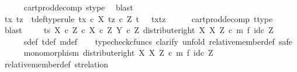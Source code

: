 \begin{isabellebody}
\ \ \ \ \isamarkupfalse%
\ cart{\isacharunderscore}{\kern0pt}prod{\isacharunderscore}{\kern0pt}decomp\ s{\isacharunderscore}{\kern0pt}type\ \isamarkupfalse%
\ blast\isanewline
\ \ \isamarkupfalse%
\ tx\ tz\ \ t{\isacharunderscore}{\kern0pt}def{\isacharbrackleft}{\kern0pt}type{\isacharunderscore}{\kern0pt}rule{\isacharbrackright}{\kern0pt}{\isacharcolon}{\kern0pt}\ {\isachardoublequoteopen}tx\ {\isasymin}\isactrlsub c\ X{\isachardoublequoteclose}\ {\isachardoublequoteopen}tz\ {\isasymin}\isactrlsub c\ Z{\isachardoublequoteclose}\ {\isachardoublequoteopen}t\ {\isacharequal}{\kern0pt}\ \ {\isasymlangle}tx{\isacharcomma}{\kern0pt}tz{\isasymrangle}{\isachardoublequoteclose}\isanewline
\ \ \ \ \isamarkupfalse%
\ cart{\isacharunderscore}{\kern0pt}prod{\isacharunderscore}{\kern0pt}decomp\ t{\isacharunderscore}{\kern0pt}type\ \isamarkupfalse%
\ blast\ \isanewline
\isanewline
\ \ \isamarkupfalse%
\ {\isachardoublequoteopen}{\isasymlangle}t{\isacharcomma}{\kern0pt}s{\isasymrangle}\ {\isasymin}\isactrlbsub {\isacharparenleft}{\kern0pt}X\ {\isasymtimes}\isactrlsub c\ Z{\isacharparenright}{\kern0pt}\ {\isasymtimes}\isactrlsub c\ {\isacharparenleft}{\kern0pt}X\ {\isasymtimes}\isactrlsub c\ Z{\isacharparenright}{\kern0pt}\isactrlesub \ {\isacharparenleft}{\kern0pt}Y\ {\isasymtimes}\isactrlsub c\ Z{\isacharcomma}{\kern0pt}\ distribute{\isacharunderscore}{\kern0pt}right\ X\ X\ Z\ {\isasymcirc}\isactrlsub c\ {\isacharparenleft}{\kern0pt}m\ {\isasymtimes}\isactrlsub f\ id\isactrlsub c\ Z{\isacharparenright}{\kern0pt}{\isacharparenright}{\kern0pt}{\isachardoublequoteclose}\ \isanewline
\ \ \ \ \isamarkupfalse%
\ s{\isacharunderscore}{\kern0pt}def\ t{\isacharunderscore}{\kern0pt}def\ m{\isacharunderscore}{\kern0pt}def\isanewline
\ \ \isamarkupfalse%
\ {\isacharparenleft}{\kern0pt}typecheck{\isacharunderscore}{\kern0pt}cfuncs{\isacharcomma}{\kern0pt}\ clarify{\isacharcomma}{\kern0pt}\ unfold\ relative{\isacharunderscore}{\kern0pt}member{\isacharunderscore}{\kern0pt}def{}{\isacharcomma}{\kern0pt}\ safe{\isacharparenright}{\kern0pt}\isanewline
\ \ \ \ \isamarkupfalse%
\ {\isachardoublequoteopen}monomorphism\ {\isacharparenleft}{\kern0pt}distribute{\isacharunderscore}{\kern0pt}right\ X\ X\ Z\ {\isasymcirc}\isactrlsub c\ m\ {\isasymtimes}\isactrlsub f\ id\isactrlsub c\ Z{\isacharparenright}{\kern0pt}{\isachardoublequoteclose}\isanewline
\ \ \ \ \ \ \isamarkupfalse%
\ relative{\isacharunderscore}{\kern0pt}member{\isacharunderscore}{\kern0pt}def{}\ st{\isacharunderscore}{\kern0pt}relation\ \isamarkupfalse%

\end{isabellebody}
